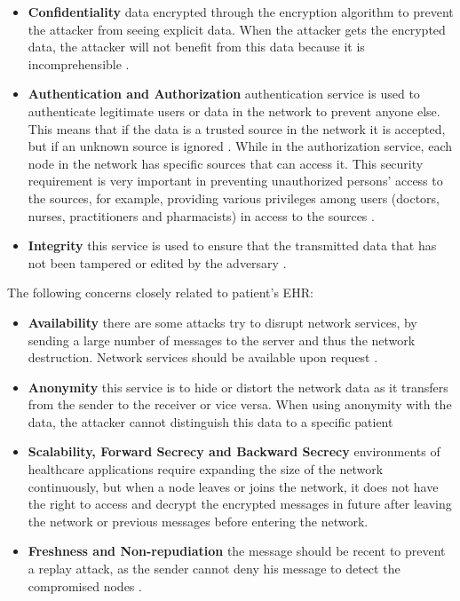\documentclass[a4paper,11pt]{article}
\begin{document}
\begin{itemize} 
\item \textbf{Confidentiality} data encrypted through the encryption algorithm to prevent the attacker from seeing explicit data. When the attacker gets the encrypted data, the attacker will not benefit from this data because it is incomprehensible \cite{pr15}. 
\item \textbf{Authentication and Authorization} authentication service is used to authenticate legitimate users or data in the network to prevent anyone else. This means that if the data is a trusted source in the network it is accepted, but if an unknown source is ignored \cite{pr16}. While in the authorization service, each node in the network has specific sources that can access it. This security requirement is very important in preventing unauthorized persons' access to the sources, for example, providing various privileges among users (doctors, nurses, practitioners and pharmacists) in access to the sources \cite{pr11}. 
\item \textbf{Integrity} this service is used to ensure that the transmitted data that has not been tampered or edited by the adversary \cite{pr18}. 
\end{itemize} 

The following concerns closely related to patient's EHR: 
\begin{itemize} 
\item \textbf{Availability} there are some attacks try to disrupt network services, by sending a large number of messages to the server and thus the network destruction. Network services should be available upon request \cite{pr14}. 
\item \textbf{Anonymity} this service is to hide or distort the network data as it transfers from the sender to the receiver or vice versa. When using anonymity with the data, the attacker cannot distinguish this data to a specific patient \cite{pr22} \item \textbf{Scalability, Forward Secrecy and Backward Secrecy} environments of healthcare applications require expanding the size of the network continuously, but when a node leaves or joins the network, it does not have the right to access and decrypt the encrypted messages in future after leaving the network or previous messages before entering the network. 
\item \textbf{Freshness and Non-repudiation} the message should be recent to prevent a replay attack, as the sender cannot deny his message to detect the compromised nodes \cite{pr14,pr17}.
\end{itemize}
\end{document}
